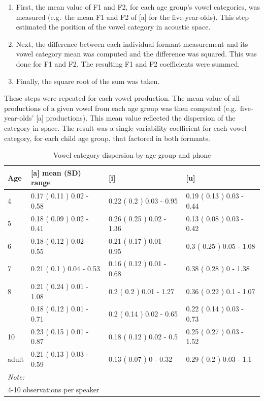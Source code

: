 \documentclass[
]{article}
\begin{document}
\begin{enumerate}
\def\labelenumi{\arabic{enumi}.}
\item
  First, the mean value of F1 and F2, for each age group's vowel categories, was measured (e.g.~the mean F1 and F2 of {[}a{]} for the five-year-olds). This step estimated the position of the vowel category in acoustic space.
\item
  Next, the difference between each individual formant measurement and its vowel category mean was computed and the difference was squared. This was done for F1 and F2. The resulting F1 and F2 coefficients were summed.
\item
  Finally, the square root of the sum was taken.
\end{enumerate}

These steps were repeated for each vowel production. The mean value of all productions of a given vowel from each age group was then computed (e.g.~five-year-olds' {[}a{]} productions). This mean value reflected the dispersion of the category in space. The result was a single variability coefficient for each vowel category, for each child age group, that factored in both formants.

\begin{table}[!h]

\caption{\label{tab:RMS-tbl-group}Vowel category dispersion by age group and phone}
\centering
\begin{tabular}[t]{llll}
\toprule
Age & [a] mean (SD) range & [i] & [u]\\
\midrule
4 & 0.17 ( 0.11 ) 0.02 - 0.58 & 0.22 ( 0.2 ) 0.03 - 0.95 & 0.19 ( 0.13 ) 0.03 - 0.44\\
5 & 0.18 ( 0.09 ) 0.02 - 0.41 & 0.26 ( 0.25 ) 0.02 - 1.36 & 0.13 ( 0.08 ) 0.03 - 0.42\\
6 & 0.18 ( 0.12 ) 0.02 - 0.55 & 0.21 ( 0.17 ) 0.01 - 0.95 & 0.3 ( 0.25 ) 0.05 - 1.08\\
7 & 0.21 ( 0.1 ) 0.04 - 0.53 & 0.16 ( 0.12 ) 0.01 - 0.68 & 0.38 ( 0.28 ) 0 - 1.38\\
8 & 0.21 ( 0.24 ) 0.01 - 1.08 & 0.2 ( 0.2 ) 0.01 - 1.27 & 0.36 ( 0.22 ) 0.1 - 1.07\\
\addlinespace
9 & 0.18 ( 0.12 ) 0.01 - 0.71 & 0.2 ( 0.14 ) 0.02 - 0.65 & 0.22 ( 0.14 ) 0.03 - 0.73\\
10 & 0.23 ( 0.15 ) 0.01 - 0.87 & 0.18 ( 0.12 ) 0.02 - 0.5 & 0.25 ( 0.27 ) 0.03 - 1.52\\
adult & 0.21 ( 0.13 ) 0.03 - 0.59 & 0.13 ( 0.07 ) 0 - 0.32 & 0.29 ( 0.2 ) 0.03 - 1.1\\
\bottomrule
\multicolumn{4}{l}{\textit{Note: }}\\
\multicolumn{4}{l}{4-10 observations per speaker}\\
\end{tabular}
\end{table}
\end{document}
